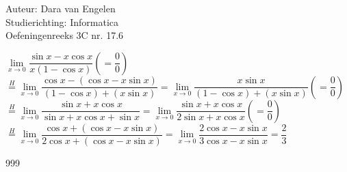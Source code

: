 \documentclass[a4paper]{article}
\begin{document}
  
\noindent \large Auteur: Dara van Engelen\\
\noindent \large Studierichting: Informatica\\
\noindent \large Oefeningenreeks 3C nr. 17.6\\

\medskip

\normalsize

$\lim\limits_{x \rightarrow 0} \dfrac{\sin x - x\cos x}{x(1-\cos x)} \left(=  \dfrac{0}{0}\right)$\\

$\overset{H}{=} \lim\limits_{x \rightarrow 0} \dfrac{\cos x - (\cos x 
- x\sin x)}{(1-\cos x) + (x\sin x)} = \lim\limits_{x \rightarrow 0} \dfrac{x\sin x}{(1-\cos x) + (x\sin x)} \left(=  \dfrac{0}{0}\right)$\\

$\overset{H}{=} \lim\limits_{x \rightarrow 0} \dfrac{\sin x + x\cos x}{\sin x + x\cos x + \sin x} =  \lim\limits_{x \rightarrow 0} \dfrac{\sin x + x\cos x}{2\sin x + x\cos x }\left(=  \dfrac{0}{0}\right)$\\

$\overset{H}{=} \lim\limits_{x \rightarrow 0} \dfrac{\cos x + (\cos x - x\sin x)}{2\cos x + (\cos x - x\sin x)} = \lim\limits_{x \rightarrow 0} \dfrac{2\cos x -x\sin x}{3\cos x - x\sin x} = \dfrac{2}{3}$\\


\begin{thebibliography}{999}
\end{thebibliography}
\end{document}
